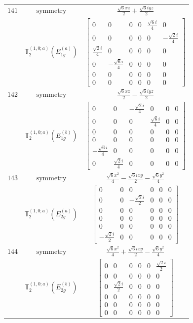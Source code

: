 \documentclass[fleqn,8pt,landscape]{jsarticle}
\begin{document}
\begin{longtable}{ccc}
$ 141 $ & $ \text{symmetry} $ & $ \frac{\sqrt{6} x z}{2} + \frac{\sqrt{6} i y z}{2} $ \\
$  $ & $ \mathbb{T}_{2}^{(1,0;a)}(E_{1g}^{(a)}) $ & $ \begin{bmatrix} 0 & 0 & 0 & 0 & \frac{\sqrt{6} i}{4} & 0 \\ 0 & 0 & 0 & 0 & 0 & - \frac{\sqrt{2} i}{4} \\ \frac{\sqrt{2} i}{4} & 0 & 0 & 0 & 0 & 0 \\ 0 & - \frac{\sqrt{6} i}{4} & 0 & 0 & 0 & 0 \\ 0 & 0 & 0 & 0 & 0 & 0 \\ 0 & 0 & 0 & 0 & 0 & 0 \end{bmatrix} $ \\ \hline
$ 142 $ & $ \text{symmetry} $ & $ \frac{\sqrt{6} x z}{2} - \frac{\sqrt{6} i y z}{2} $ \\
$  $ & $ \mathbb{T}_{2}^{(1,0;a)}(E_{1g}^{(b)}) $ & $ \begin{bmatrix} 0 & 0 & - \frac{\sqrt{2} i}{4} & 0 & 0 & 0 \\ 0 & 0 & 0 & \frac{\sqrt{6} i}{4} & 0 & 0 \\ 0 & 0 & 0 & 0 & 0 & 0 \\ 0 & 0 & 0 & 0 & 0 & 0 \\ - \frac{\sqrt{6} i}{4} & 0 & 0 & 0 & 0 & 0 \\ 0 & \frac{\sqrt{2} i}{4} & 0 & 0 & 0 & 0 \end{bmatrix} $ \\ \hline
$ 143 $ & $ \text{symmetry} $ & $ \frac{\sqrt{6} x^{2}}{4} - \frac{\sqrt{6} i x y}{2} - \frac{\sqrt{6} y^{2}}{4} $ \\
$  $ & $ \mathbb{T}_{2}^{(1,0;a)}(E_{2g}^{(a)}) $ & $ \begin{bmatrix} 0 & 0 & 0 & 0 & 0 & 0 \\ 0 & 0 & - \frac{\sqrt{2} i}{2} & 0 & 0 & 0 \\ 0 & 0 & 0 & 0 & 0 & 0 \\ 0 & 0 & 0 & 0 & 0 & 0 \\ 0 & 0 & 0 & 0 & 0 & 0 \\ - \frac{\sqrt{2} i}{2} & 0 & 0 & 0 & 0 & 0 \end{bmatrix} $ \\ \hline
$ 144 $ & $ \text{symmetry} $ & $ \frac{\sqrt{6} x^{2}}{4} + \frac{\sqrt{6} i x y}{2} - \frac{\sqrt{6} y^{2}}{4} $ \\
$  $ & $ \mathbb{T}_{2}^{(1,0;a)}(E_{2g}^{(b)}) $ & $ \begin{bmatrix} 0 & 0 & 0 & 0 & 0 & \frac{\sqrt{2} i}{2} \\ 0 & 0 & 0 & 0 & 0 & 0 \\ 0 & \frac{\sqrt{2} i}{2} & 0 & 0 & 0 & 0 \\ 0 & 0 & 0 & 0 & 0 & 0 \\ 0 & 0 & 0 & 0 & 0 & 0 \\ 0 & 0 & 0 & 0 & 0 & 0 \end{bmatrix} $ \\ \hline

\end{longtable}
\end{document}
